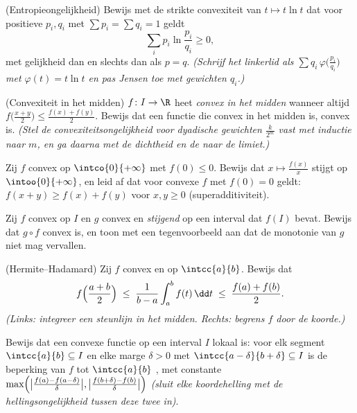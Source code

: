 \begin{exercise}[$\star\star$]\label{exo:b2:realfun:7}
(Entropieongelijkheid) Bewijs met de strikte convexiteit van $t
\mapsto t\ln t$ dat voor positieve $p_i, q_i$ met $\sum p_i = \sum
q_i = 1$ geldt
\[
\sum_i p_i \ln\frac{p_i}{q_i} \geq 0 ,
\]
met gelijkheid dan en slechts dan als $p = q$. \emph{(Schrijf het
linkerlid als $\sum q_i\, \varphi\bigl(\frac{p_i}{q_i}\bigr)$ met
$\varphi(t) = t\ln t$ en pas Jensen toe met gewichten $q_i$.)}
\end{exercise}

\begin{exercise}[$\star\star\star$]\label{exo:b2:realfun:8}
(Convexiteit in het midden) $f \colon I \to \R$ heet \emph{convex
in het midden} wanneer altijd $f\bigl(\frac{x+y}{2}\bigr) \leq
\frac{f(x) + f(y)}{2}$. Bewijs dat een \emph{} functie die
convex in het midden is, convex is. \emph{(Stel de
convexiteitsongelijkheid voor dyadische gewichten $\frac{k}{2^m}$
vast met inductie naar $m$, en ga daarna met de dichtheid en de
 naar de limiet.)}
\end{exercise}

\begin{exercise}[$\star\star\star$]\label{exo:b2:realfun:9}
Zij $f$ convex op $\intco{0}{+\infty}$ met $f(0) \leq 0$. Bewijs
dat $x \mapsto \frac{f(x)}{x}$ stijgt op $\intoo{0}{+\infty}$, en
leid af dat voor convexe $f$ met $f(0) = 0$ geldt: $f(x + y) \geq
f(x) + f(y)$ voor $x, y \geq 0$ (superadditiviteit).
\end{exercise}

\begin{exercise}[$\star$]\label{exo:b2:realfun:10}
Zij $f$ convex op $I$ en $g$ convex en \emph{stijgend} op een
interval dat $f(I)$ bevat. Bewijs dat $g \circ f$ convex is, en
toon met een tegenvoorbeeld aan dat de monotonie van $g$ niet mag
vervallen.
\end{exercise}

\begin{exercise}[$\star\star$]\label{exo:b2:realfun:11}
(Hermite--Hadamard) Zij $f$ convex en  op $\intcc{a}{b}$.
Bewijs dat
\[
f\Bigl(\frac{a+b}{2}\Bigr) \;\leq\; \frac{1}{b -
a}\int_a^b f(t)\,\dd t \;\leq\; \frac{f(a) + f(b)}{2} .
\]
\emph{(Links: integreer een steunlijn in het midden. Rechts:
begrens $f$ door de koorde.)}
\end{exercise}

\begin{exercise}[$\star\star\star$]\label{exo:b2:realfun:12}
Bewijs dat een convexe functie op een \emph{} interval $I$
lokaal  is: voor elk segment $\intcc{a}{b} \subseteq I$ en
elke marge $\delta > 0$ met $\intcc{a - \delta}{b + \delta}
\subseteq I$ is de beperking van $f$ tot $\intcc{a}{b}$ ,
met constante $\max\Bigl(\bigl|\frac{f(a) - f(a -
\delta)}{\delta}\bigr|, \bigl|\frac{f(b + \delta) -
f(b)}{\delta}\bigr|\Bigr)$ \emph{(sluit elke koordehelling met de
hellingsongelijkheid tussen deze twee in)}.
\end{exercise}

